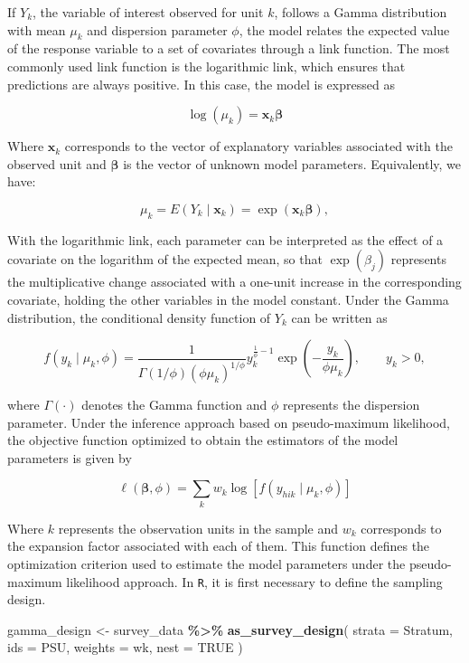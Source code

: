 \documentclass[
  english,
  12pt,
]{book}
\newenvironment{Shaded}{\begin{snugshade}}{\end{snugshade}}
\newcommand{\AttributeTok}[1]{\textcolor[rgb]{0.13,0.29,0.53}{#1}}
\newcommand{\ConstantTok}[1]{\textcolor[rgb]{0.56,0.35,0.01}{#1}}
\newcommand{\FunctionTok}[1]{\textcolor[rgb]{0.13,0.29,0.53}{\textbf{#1}}}
\newcommand{\NormalTok}[1]{#1}
\newcommand{\OtherTok}[1]{\textcolor[rgb]{0.56,0.35,0.01}{#1}}
\newcommand{\SpecialCharTok}[1]{\textcolor[rgb]{0.81,0.36,0.00}{\textbf{#1}}}
\begin{document}
If \(Y_{k}\), the variable of interest observed for unit \(k\), follows a Gamma distribution with mean \(\mu_{k}\) and dispersion parameter \(\phi\), the model relates the expected value of the response variable to a set of covariates through a link function. The most commonly used link function is the logarithmic link, which ensures that predictions are always positive. In this case, the model is expressed as

\[
\log(\mu_{k})
=
\mathbf{x}_{k}\boldsymbol{\beta}
\]

Where \(\mathbf{x}_{k}\) corresponds to the vector of explanatory variables associated with the observed unit and \(\boldsymbol{\beta}\) is the vector of unknown model parameters. Equivalently, we have:

\[
\mu_{k}
= E(Y_{k}\mid \mathbf{x}_{k})
=
\exp(\mathbf{x}_{k}\boldsymbol{\beta}),
\]

With the logarithmic link, each parameter can be interpreted as the effect of a covariate on the logarithm of the expected mean, so that \(\exp(\beta_j)\) represents the multiplicative change associated with a one-unit increase in the corresponding covariate, holding the other variables in the model constant. Under the Gamma distribution, the conditional density function of \(Y_{k}\) can be written as

\[
f(y_{k}\mid \mu_{k},\phi)
=
\frac{1}
{\Gamma(1/\phi)
(\phi\mu_{k})^{1/\phi}}
y_{k}^{\frac{1}{\phi}-1}
\exp\left(
-\frac{y_{k}}
{\phi\mu_{k}}
\right),
\qquad y_{k}>0,
\]

where \(\Gamma(\cdot)\) denotes the Gamma function and \(\phi\) represents the dispersion parameter. Under the inference approach based on pseudo-maximum likelihood, the objective function optimized to obtain the estimators of the model parameters is given by

\[
\ell(\boldsymbol{\beta},\phi)
=
\sum_{k}
w_{k}
\log
\left[
f(y_{hik}\mid\mu_{k},\phi)
\right]
\]

Where \(k\) represents the observation units in the sample and \(w_k\) corresponds to the expansion factor associated with each of them. This function defines the optimization criterion used to estimate the model parameters under the pseudo-maximum likelihood approach. In \texttt{R}, it is first necessary to define the sampling design.

\begin{Shaded}
\begin{Highlighting}[]
\NormalTok{gamma\_design }\OtherTok{\textless{}{-}}\NormalTok{ survey\_data }\SpecialCharTok{\%\textgreater{}\%}
  \FunctionTok{as\_survey\_design}\NormalTok{(}
    \AttributeTok{strata =}\NormalTok{ Stratum,}
    \AttributeTok{ids =}\NormalTok{ PSU,}
    \AttributeTok{weights =}\NormalTok{ wk,}
    \AttributeTok{nest =} \ConstantTok{TRUE}
\NormalTok{  )}
\end{Highlighting}
\end{Shaded}
\end{document}
